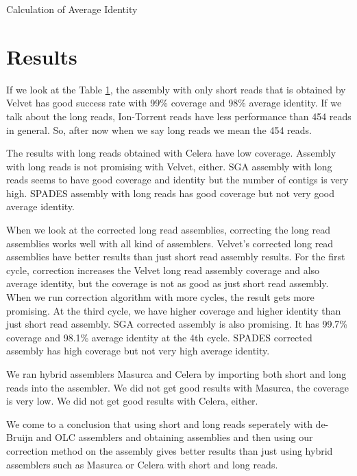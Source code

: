\documentclass{bioinfo}
\begin{document}
\begin{algorithm}
\caption{Calculation of Average Identity}
\label{avgIdentity}
\begin{algorithmic} 
\ENDWHILE
{}
\end{algorithmic}
\end{algorithm}

\section{Results}
\label{res}
If we look at the Table \ref{res}, the assembly with only short reads that is obtained by Velvet has good success rate with 99\% coverage and 98\% average identity. 
If we talk about the long reads, Ion-Torrent reads have less performance than 454 reads in general. So, after now when we say long reads we mean the 454 reads.

The results with long reads obtained with Celera have low coverage. 
Assembly with long reads is not promising with Velvet, either. SGA assembly with long reads seems to have good coverage and identity but the number of contigs is very high. 
SPADES assembly with long reads has good coverage but not very good average identity. 

When we look at the corrected long read assemblies, correcting the long read assemblies works well with all kind of assemblers. Velvet's corrected long read assemblies have better results than just short read assembly results. For the first cycle, correction increases the Velvet long read assembly coverage and also average identity, but the coverage is not as good as just short read assembly. When we run correction algorithm with more cycles, the result gets more promising. At the third cycle, we have higher coverage and higher identity than just short read assembly. SGA corrected assembly is also promising. It has 99.7\% coverage and 98.1\% average identity at the 4th cycle. SPADES corrected assembly has high coverage but not very high average identity. 

We ran hybrid assemblers Masurca and Celera by importing both short and long reads into the assembler. We did not get good results with Masurca, the coverage is very low. We did not get good results with Celera, either.

We come to a conclusion that using short and long reads seperately with de-Bruijn and OLC assemblers and obtaining assemblies and then using our correction method on the assembly gives better results than just using hybrid assemblers such as Masurca or Celera with short and long reads.
\end{document}
